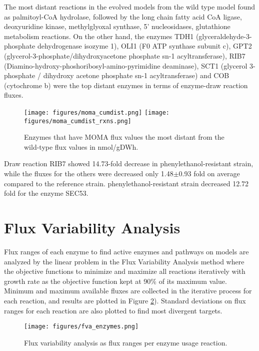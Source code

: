 The most distant reactions in the evolved models from the wild type model found as palmitoyl-CoA hydrolase, followed by the long chain fatty acid CoA ligase, deoxyuridine kinase, methylglyoxal synthase, 5' nucleosidases, glutathione metabolism reactions. On the other hand, the enzymes TDH1 (glyceraldehyde-3-phosphate dehydrogenase isozyme 1), OLI1 (F0 ATP synthase subunit c), GPT2 (glycerol-3-phosphate/dihydroxyacetone phosphate sn-1 acyltransferase), RIB7 (Diamino-hydroxy-phoshoribosyl-amino-pyrimidine deaminase), SCT1 (glycerol 3-phosphate / dihydroxy acetone phosphate sn-1 acyltransferase) and COB (cytochrome b) were the top distant enzymes in terms of enzyme-draw reaction fluxes.

\begin{figure}[H]
  \begin{center}
  \texttt{[image: figures/moma\_cumdist.png]}
  \texttt{[image: figures/moma\_cumdist\_rxns.png]}
  \caption[Enzymes that have MOMA flux values the most distant from the wild-type flux values in nmol/gDWh]{Enzymes that have MOMA flux values the most distant from the wild-type flux values in nmol/gDWh.}
  \label{fig:moma_cumdist}
  \end{center}
\end{figure}

\vspace{-1cm}

Draw reaction RIB7 showed 14.73-fold decrease in phenylethanol-resistant strain, while the fluxes for the others were decreased only 1.48$\pm$0.93 fold on average compared to the reference strain. phenylethanol-resistant strain decreased 12.72 fold for the enzyme SEC53.

\section{Flux Variability Analysis}
Flux ranges of each enzyme to find active enzymes and pathways on models are analyzed by the linear problem in the Flux Variability Analysis method where the objective functions to minimize and maximize all reactions iteratively with growth rate as the objective function kept at 90\% of its maximum value. Minimum and maximum available fluxes are collected in the iterative process for each reaction, and results are plotted in Figure \ref{fig:fva_enzymes}). Standard deviations on flux ranges for each reaction are also plotted to find most divergent targets.

\begin{figure}[H]
  \begin{center}
  \texttt{[image: figures/fva\_enzymes.png]}
  \caption[Flux variability analysis results as flux ranges per enzyme usage reaction, sorted by the wild-type flux ranges]{Flux variability analysis as flux ranges per enzyme usage reaction.}
  \end{center}
  \label{fig:fva_enzymes}
  \end{figure}

